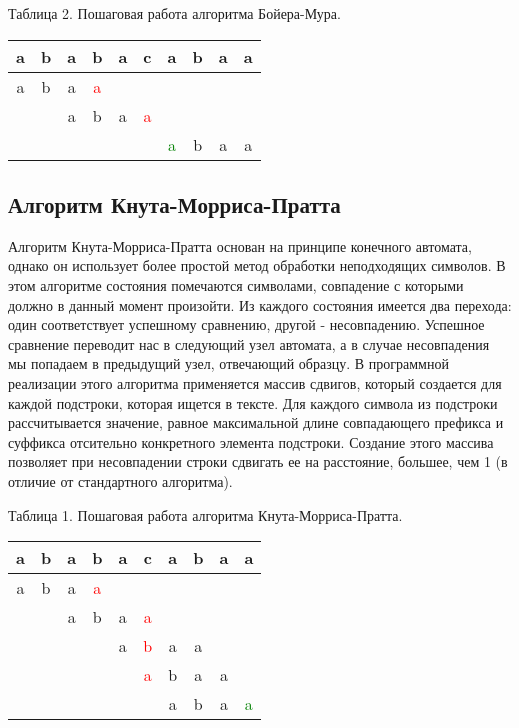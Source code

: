 \documentclass[12pt]{report}
\begin{document}
\begin{center}
Таблица 2. Пошаговая работа алгоритма Бойера-Мура.\\
\begin{tabular}{| c | c | c | c | c | c | c | c | c | c | }
	\hline
	a&b&a&b&a&c&a&b&a&a \\
	\hline
	\hline
	a&b&a&\textcolor{red}{a}&&&&&&\\
	\hline
	&&a&b&a&\textcolor{red}{a}&&&&\\
	\hline
	&&&&&&\textcolor{green}{a}&b&a&a\\
	\hline
\end{tabular}
\end{center}


\subsection{Алгоритм Кнута-Морриса-Пратта}
Алгоритм Кнута-Морриса-Пратта основан на принципе конечного автомата, однако он использует более простой метод обработки неподходящих символов. В этом алгоритме состояния помечаются символами, совпадение с которыми должно в данный момент произойти. Из каждого состояния имеется два перехода: один соответствует успешному сравнению, другой - несовпадению. Успешное сравнение переводит нас в следующий узел автомата, а в случае несовпадения мы попадаем в предыдущий узел, отвечающий образцу. 
В программной реализации этого алгоритма применяется массив сдвигов, который создается для каждой подстроки, которая ищется в тексте. Для каждого символа из подстроки рассчитывается значение, равное максимальной длине совпадающего префикса и суффикса отсительно конкретного элемента подстроки. Создание этого массива позволяет при несовпадении строки сдвигать ее на расстояние, большее, чем 1 (в отличие от стандартного алгоритма).

\begin{center}
	Таблица 1. Пошаговая работа алгоритма Кнута-Морриса-Пратта.\\
	
	\begin{tabular}{| c | c | c | c | c | c | c | c | c | c | }
		\hline
		a&b&a&b&a&c&a&b&a&a \\
		\hline
		\hline
		a&b&a&\textcolor{red}{a}&&&&&&\\
		\hline
		&&a&b&a&\textcolor{red}{a}&&&&\\
		\hline
		&&&&a&\textcolor{red}{b}&a&a&&\\
		\hline
		&&&&&\textcolor{red}{a}&b&a&a&\\
		\hline
		&&&&&&a&b&a&\textcolor{green}{a}\\
		\hline
	\end{tabular}
\end{center}
\end{document}
